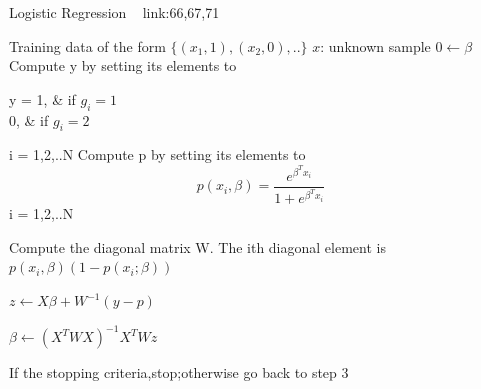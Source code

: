 \documentclass[a4paper]{article}
\begin{document}
  \begin{algorithm}
   \caption{Logistic Regression  ~\cite{logistic1 
   } link:66,67,71 }
    \begin{algorithmic}[1]
    \INPUT 
    \Statex Training data of the form $\{(x_{1},1),(x_{2},0),..\}$
    \Statex  $x$: unknown sample
    \State $0 \leftarrow \beta$
 \State Compute y by setting its elements to
   \begin{numcases}{ y =}
  1, & if $g_{i} = 1 $\\
  0, &  if $g_{i} = 2 $
\end{numcases}
 i = 1,2,..N
 \State Compute p by setting its elements to
 $$p(x_{i},\beta) = \frac{e^{\beta^{T}x_{i}}}{1+ e^{\beta^{T}x_{i}}} $$   i = 1,2,..N
 
\State Compute the diagonal matrix W. The ith diagonal element is  $p(x_{i},\beta)(1-p(x_{i};\beta))$
    
\State $z \leftarrow X\beta + W ^{-1}(y - p) $

\State $\beta \leftarrow (X^{T}WX)^{-1}X^{T}Wz$

\State If the stopping criteria,stop;otherwise go back to step 3
    
     
       
        


\end{algorithmic}
\end{algorithm}
\end{document}
